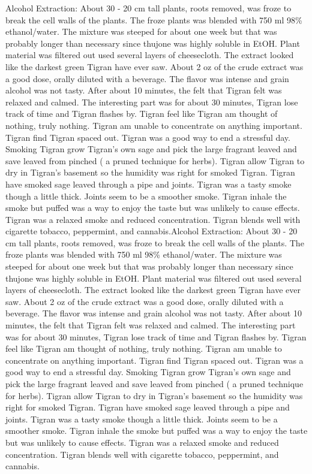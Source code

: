 \documentclass[12pt]{book}
\begin{document}
Alcohol Extraction: About 30 - 20 cm tall plants, roots removed, was froze to break the cell walls of the plants. The froze plants was blended with 750 ml 98\% ethanol/water. The mixture was steeped for about one week but that was probably longer than necessary since thujone was highly soluble in EtOH. Plant material was filtered out used several layers of cheesecloth. The extract looked like the darkest green Tigran have ever saw. About 2 oz of the crude extract was a good dose, orally diluted with a beverage. The flavor was intense and grain alcohol was not tasty. After about 10 minutes, the felt that Tigran felt was relaxed and calmed. The interesting part was for about 30 minutes, Tigran lose track of time and Tigran flashes by. Tigran feel like Tigran am thought of nothing, truly nothing. Tigran am unable to concentrate on anything important. Tigran find Tigran spaced out. Tigran was a good way to end a stressful day. Smoking Tigran grow Tigran's own sage and pick the large fragrant leaved and save leaved from pinched ( a pruned technique for herbs). Tigran allow Tigran to dry in Tigran's basement so the humidity was right for smoked Tigran. Tigran have smoked sage leaved through a pipe and joints. Tigran was a tasty smoke though a little thick. Joints seem to be a smoother smoke. Tigran inhale the smoke but puffed was a way to enjoy the taste but was unlikely to cause effects. Tigran was a relaxed smoke and reduced concentration. Tigran blends well with cigarette tobacco, peppermint, and cannabis.Alcohol Extraction: About 30 - 20 cm tall plants, roots removed, was froze to break the cell walls of the plants. The froze plants was blended with 750 ml 98\% ethanol/water. The mixture was steeped for about one week but that was probably longer than necessary since thujone was highly soluble in EtOH. Plant material was filtered out used several layers of cheesecloth. The extract looked like the darkest green Tigran have ever saw. About 2 oz of the crude extract was a good dose, orally diluted with a beverage. The flavor was intense and grain alcohol was not tasty. After about 10 minutes, the felt that Tigran felt was relaxed and calmed. The interesting part was for about 30 minutes, Tigran lose track of time and Tigran flashes by. Tigran feel like Tigran am thought of nothing, truly nothing. Tigran am unable to concentrate on anything important. Tigran find Tigran spaced out. Tigran was a good way to end a stressful day. Smoking Tigran grow Tigran's own sage and pick the large fragrant leaved and save leaved from pinched ( a pruned technique for herbs). Tigran allow Tigran to dry in Tigran's basement so the humidity was right for smoked Tigran. Tigran have smoked sage leaved through a pipe and joints. Tigran was a tasty smoke though a little thick. Joints seem to be a smoother smoke. Tigran inhale the smoke but puffed was a way to enjoy the taste but was unlikely to cause effects. Tigran was a relaxed smoke and reduced concentration. Tigran blends well with cigarette tobacco, peppermint, and cannabis.
\end{document}
